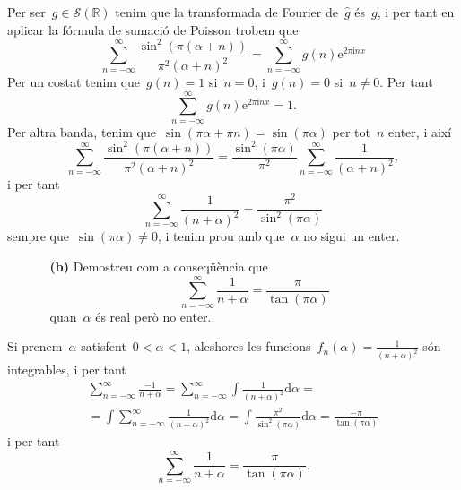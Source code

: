 \documentclass[a4paper]{article}
\theoremstyle{plain}
\newcommand{\iu}{\mathrm{i}}
\newcommand{\e}{\mathrm{e}}
\providecommand{\uppi}{\pi}
\newcommand{\diff}{\mathrm{d}}
\newcommand{\Sc}{\mathcal{S}}
\begin{document}
Per ser~\(g\in\Sc(\mathbb{R})\) tenim que la transformada de Fourier
de~\(\widehat{g}\) és~\(g\), i per tant en aplicar la fórmula de sumació de
Poisson trobem que
\[
    \sum_{n=-\infty}^{\infty}
    \frac{\sin^{2}(\uppi(\alpha+n))}{\uppi^{2}(\alpha+n)^{2}}
    =
    \sum_{n=-\infty}^{\infty}
    g(n) \e^{2\uppi\iu nx}
\]
Per un costat tenim que~\(g(n)=1\) si~\(n=0\), i~\(g(n)=0\) si~\(n\neq0\).
Per tant
\[
    \sum_{n=-\infty}^{\infty}
    g(n) \e^{2\uppi\iu nx}
    = 1.
\]
Per altra banda, tenim que~\(\sin(\uppi\alpha+\uppi n)=\sin(\uppi\alpha)\) per
tot~\(n\) enter, i així
\[
    \sum_{n=-\infty}^{\infty}
    \frac{\sin^{2}(\uppi(\alpha+n))}{\uppi^{2}(\alpha+n)^{2}}
    =
    \frac{\sin^{2}(\uppi\alpha)}{\uppi^{2}}
    \sum_{n=-\infty}^{\infty}
    \frac{1}{(\alpha+n)^{2}},
\]
i per tant
\[
    \sum_{n=-\infty}^{\infty} \frac{1}{(n+\alpha)^{2}}
    = \frac{\uppi^{2}}{\sin^{2}(\uppi\alpha)}
\]
sempre que~\(\sin(\uppi\alpha)\neq0\), i tenim prou amb que~\(\alpha\) no sigui
un enter.

\clearpage

\begin{enumerate}
    \item[]\begin{enumerate}
        \item[\textbf{(b)}] Demostreu com a conseqüència que
            \[
                \sum_{n=-\infty}^{\infty} \frac{1}{n+\alpha}
                = \frac{\uppi}{\tan(\uppi\alpha)}
            \]
            quan~\(\alpha\) és real però no enter.
    \end{enumerate}
\end{enumerate}

Si prenem~\(\alpha\) satisfent~\(0<\alpha<1\), aleshores les
funcions~\(f_{n}(\alpha)=\frac{1}{(n+\alpha)^{2}}\) són integrables, i per tant
\begin{multline*}
    \sum_{n=-\infty}^{\infty}
    \frac{-1}{n+\alpha}
    =
    \sum_{n=-\infty}^{\infty}
    \int
    \frac{1}{(n+\alpha)^{2}}
    \diff\alpha
    = \\ =
    \int
    \sum_{n=-\infty}^{\infty}
    \frac{1}{(n+\alpha)^{2}}
    \diff\alpha
    =
    \int
    \frac{\uppi^{2}}{\sin^{2}(\uppi\alpha)}
    \diff\alpha
    =
    \frac{-\uppi}{\tan(\uppi\alpha)}
\end{multline*}
i per tant
\[
    \sum_{n=-\infty}^{\infty} \frac{1}{n+\alpha}
    = \frac{\uppi}{\tan(\uppi\alpha)}.
\]

\clearpage
\end{document}
